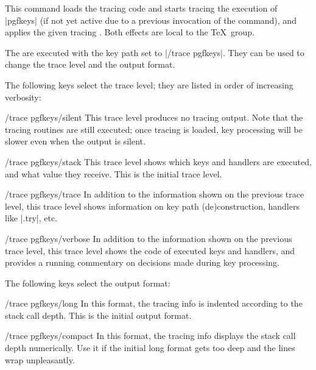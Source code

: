 \begin{command}{\tracepgfkeys{}}
  This command loads the tracing code and starts tracing the execution of
  |pgfkeys| (if not yet active due to a previous invocation of the command),
  and applies the given tracing .  Both effects are local to the
  \TeX\ group.

  The  are executed with the key path set to |/trace pgfkeys|.
  They can be used to change the trace level and the output format.

  The following keys select the trace level; they are listed in order of
  increasing verbosity:
  \begin{key}{/trace pgfkeys/silent}
    This trace level produces no tracing output.  Note that the tracing
    routines are still executed; once tracing is loaded, key processing will be
    slower even when the output is silent.
  \end{key}
  \begin{key}{/trace pgfkeys/stack}
    This trace level shows which keys and handlers are executed, and what value
    they receive.  This is the initial trace level.
  \end{key}
  \begin{key}{/trace pgfkeys/trace}
    In addition to the information shown on the previous trace level, this
    trace level shows information on key path (de)construction, handlers like
    |.try|, etc.
  \end{key}
  \begin{key}{/trace pgfkeys/verbose}
    In addition to the information shown on the previous trace level, this
    trace level shows the code of executed keys and handlers, and provides a
    running commentary on decisions made during key processing.
  \end{key}
  
  The following keys select the output format:
  \begin{key}{/trace pgfkeys/long}
    In this format, the tracing info is indented according to the stack call
    depth.  This is the initial output format.
  \end{key}
  \begin{key}{/trace pgfkeys/compact}
    In this format, the tracing info displays the stack call depth numerically.
    Use it if the initial long format gets too deep and the lines wrap
    unpleasantly.
  \end{key}
  
\begin{codeexample}
  \begingroup
  \tracepgfkeys %
  \endgroup
  \tracepgfkeys[silent] %
\end{codeexample}


\end{command}
